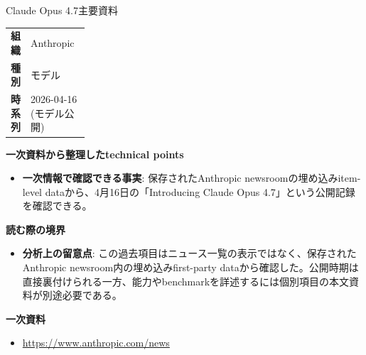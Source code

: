 \begin{technicalnote}{Claude Opus 4.7}{主要資料}
\begingroup
\begin{tabularx}{\linewidth}{@{}>{\bfseries}p{0.22\linewidth}X@{}}
組織 & Anthropic \\
種別 & モデル \\
時系列 & 2026-04-16 (モデル公開) \\
\end{tabularx}
\smallskip
{\bfseries 一次資料から整理したtechnical points}
\begin{itemize}[leftmargin=1.5em,itemsep=0.35em]
\item \textbf{一次情報で確認できる事実}: 保存されたAnthropic newsroomの埋め込みitem-level dataから、4月16日の「Introducing Claude Opus 4.7」という公開記録を確認できる。
\end{itemize}
{\bfseries 読む際の境界}
\begin{itemize}[leftmargin=1.5em,itemsep=0.35em]
\item \textbf{分析上の留意点}: この過去項目はニュース一覧の表示ではなく、保存されたAnthropic newsroom内の埋め込みfirst-party dataから確認した。公開時期は直接裏付けられる一方、能力やbenchmarkを詳述するには個別項目の本文資料が別途必要である。
\end{itemize}
\begin{samepage}
{\bfseries 一次資料}
\begingroup\sloppy
\begin{itemize}[leftmargin=1.5em,itemsep=0.25em]
\item {\scriptsize\url{https://www.anthropic.com/news}}
\end{itemize}
\endgroup
\end{samepage}
\endgroup
\end{technicalnote}
\medskip

